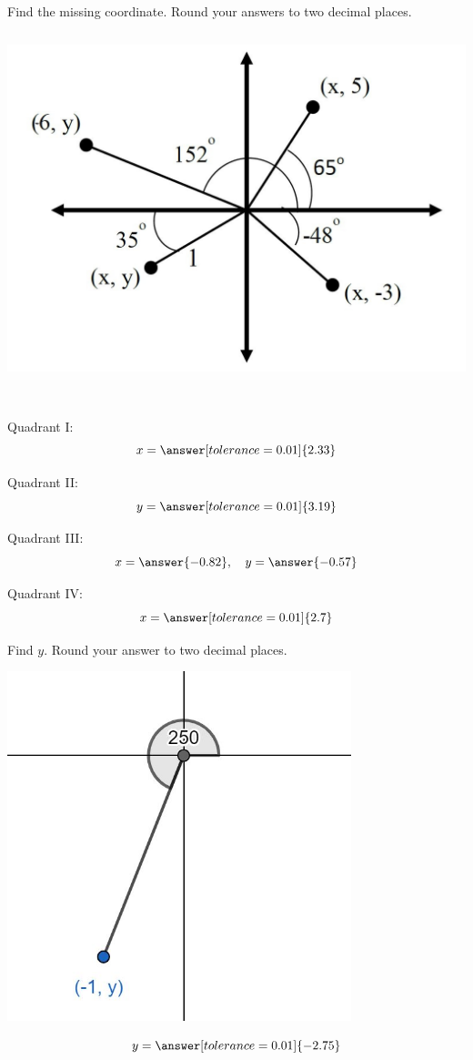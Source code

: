 \documentclass{ximera}
\begin{document}
\begin{problem}\label{prob:160hom10prob7}
Find the missing coordinate.  Round your answers to two decimal places.
\begin{image}
   
\includegraphics[height=4in]{160H10pic2.jpg}~
 
\end{image}

Quadrant I:
$$x=\answer[tolerance=0.01]{2.33}$$

Quadrant II:
$$y=\answer[tolerance=0.01]{3.19}$$

Quadrant III:
$$x=\answer{-0.82},\quad y=\answer{-0.57}$$

Quadrant IV:
$$x=\answer[tolerance=0.01]{2.7}$$
\end{problem}

\begin{problem}\label{prob:160hom10prob8}
Find $y$.  Round your answer to two decimal places.
 
 \begin{image}
   
\includegraphics[height=4in]{160H10pic1.jpg}

\end{image}
$$y=\answer[tolerance=0.01]{-2.75}$$
\end{problem}
\end{document}
